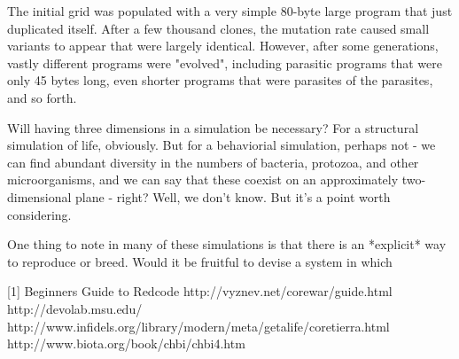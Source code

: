 The initial grid was populated with a very simple 80-byte large program that just duplicated itself. After a few thousand clones, the mutation rate caused small variants to appear that were largely identical. However, after some generations, vastly different programs were "evolved", including parasitic programs that were only 45 bytes long, even shorter programs that were parasites of the parasites, and so forth.	

Will having three dimensions in a simulation be necessary? For a structural simulation of life, obviously. But for a behaviorial simulation, perhaps not - we can find abundant diversity in the numbers of bacteria, protozoa, and other microorganisms, and we can say that these coexist on an approximately two-dimensional plane - right? Well, we don't know. But it's a point worth considering.

One thing to note in many of these simulations is that there is an *explicit* way to reproduce or breed. Would it be fruitful to devise a system in which 


[1] Beginners Guide to Redcode http://vyznev.net/corewar/guide.html
http://devolab.msu.edu/
http://www.infidels.org/library/modern/meta/getalife/coretierra.html
http://www.biota.org/book/chbi/chbi4.htm
